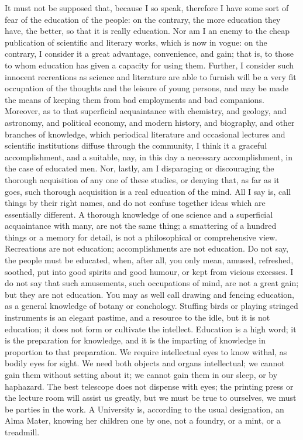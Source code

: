 It must not be supposed that, because I so speak, therefore I have
some sort of fear of the education of the people: on the contrary, the
more education they have, the better, so that it is really education.
Nor am I an enemy to the cheap publication of scientific and literary
works, which is now in vogue: on the contrary, I consider it a great
advantage, convenience, and gain; that is, to those to whom education
has given a capacity for using them. Further, I consider such innocent
recreations as science and literature are able to furnish will be a
very fit occupation of the thoughts and the leisure of young persons,
and may be made the means of keeping them from bad employments and bad
companions. Moreover, as to that superficial acquaintance with
chemistry, and geology, and astronomy, and political economy, and
modern history, and biography, and other branches of knowledge, which
periodical literature and occasional lectures and scientific
institutions diffuse through the community, I think it a
graceful accomplishment, and a suitable, nay, in this day a necessary
accomplishment, in the case of educated men. Nor, lastly, am I
disparaging or discouraging the thorough acquisition of any one of
these studies, or denying that, as far as it goes, such thorough
acquisition is a real education of the mind. All I say is, call things
by their right names, and do not confuse together ideas which are
essentially different. A thorough knowledge of one science and a
superficial acquaintance with many, are not the same thing; a
smattering of a hundred things or a memory for detail, is not a
philosophical or comprehensive view. Recreations are not education;
accomplishments are not education. Do not say, the people must be
educated, when, after all, you only mean, amused, refreshed, soothed,
put into good spirits and good humour, or kept from vicious excesses.
I do not say that such amusements, such occupations of mind, are not a
great gain; but they are not education. You may as well call drawing
and fencing education, as a general knowledge of botany or conchology.
Stuffing birds or playing stringed instruments is an elegant pastime,
and a resource to the idle, but it is not education; it does not form
or cultivate the intellect. Education is a high word; it is the
preparation for knowledge, and it is the imparting of knowledge in
proportion to that preparation. We require intellectual eyes to know
withal, as bodily eyes for sight. We need both objects and organs
intellectual; we cannot gain them without setting about it; we cannot
gain them in our sleep, or by haphazard. The best telescope does not
dispense with eyes; the printing press or the lecture room will assist
us greatly, but we must be true to ourselves, we must be parties in
the work. A University is, according to the usual designation, an Alma
Mater, knowing her children one by one, not a foundry, or a
mint, or a treadmill.

